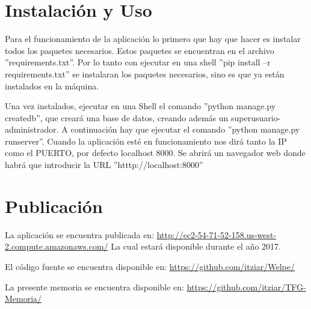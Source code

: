 \cleardoublepage
\appendix
\chapter{Instalación y Uso}
\label{app:instalacion}


Para el funcionamiento de la aplicación lo primero que hay que hacer es instalar todos los paquetes necesarios. Estos paquetes se encuentran en el archivo ''requirements.txt''. Por lo tanto con ejecutar en una shell ''pip install –r requirements.txt'' se instalaran los paquetes necesarios, sino es que ya están instalados en la máquina.


Una vez instalados, ejecutar en una Shell el comando ''python manage.py createdb'', que creará una base de datos, creando además un superusuario-administrador. A continuación hay que ejecutar el comando ''python manage.py runserver''. Cuando la aplicación esté en funcionamiento nos dirá tanto la IP como el PUERTO, por defecto localhost 8000. Se abrirá un navegador web donde habrá que introducir la URL ''htttp://localhost:8000''

\cleardoublepage
\chapter{Publicación}
\label{app:publicacion}

La aplicación se encuentra publicada en: 
\url{http://ec2-54-71-52-158.us-west-2.compute.amazonaws.com/}
La cual estará disponible durante el año 2017.


El código fuente se encuentra disponible en:
\url{https://github.com/itziar/Welpe/}


La presente memoria se encuentra disponible en:
\url{https://github.com/itziar/TFG-Memoria/}




